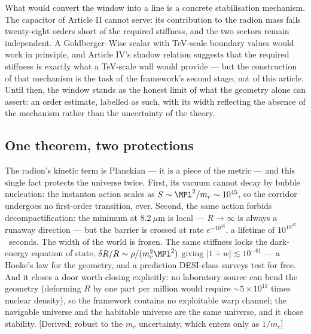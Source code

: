What would convert the window into a line is a concrete stabilisation mechanism. The capacitor of Article II cannot serve: its contribution to the radion mass falls twenty-eight orders short of the required stiffness, and the two sectors remain independent. A Goldberger--Wise scalar with TeV-scale boundary values would work in principle, and Article IV's shadow relation suggests that the required stiffness is exactly what a TeV-scale wall would provide --- but the construction of that mechanism is the task of the framework's second stage, not of this article. Until then, the window stands as the honest limit of what the geometry alone can assert: an order estimate, labelled as such, with its width reflecting the absence of the mechanism rather than the uncertainty of the theory.

\subsection{One theorem, two protections}
The radion's kinetic term is Planckian --- it is a piece of the metric --- and this single fact protects the universe twice. First, its vacuum cannot decay by bubble nucleation: the instanton action scales as $S\sim\MPl^{2}/m_{r}\sim10^{45}$, so the corridor undergoes no first-order transition, ever. Second, the same action forbids decompactification: the minimum at $8.2~\mu$m is local --- $R\to\infty$ is always a runaway direction --- but the barrier is crossed at rate $e^{-10^{45}}$, a lifetime of $10^{10^{45}}$~seconds. The width of the world is frozen. The same stiffness locks the dark-energy equation of state, $\delta R/R\sim\rho/(m_{r}^{2}\MPl^{2})$ giving $|1+w|\lesssim10^{-61}$ --- a Hooke's law for the geometry, and a prediction DESI-class surveys test for free. And it closes a door worth closing explicitly: no laboratory source can bend the geometry (deforming $R$ by one part per million would require $\sim5\times10^{11}$ times nuclear density), so the framework contains no exploitable warp channel; the navigable universe and the habitable universe are the same universe, and it chose stability. [Derived; robust to the $m_{r}$ uncertainty, which enters only as $1/m_{r}$]

